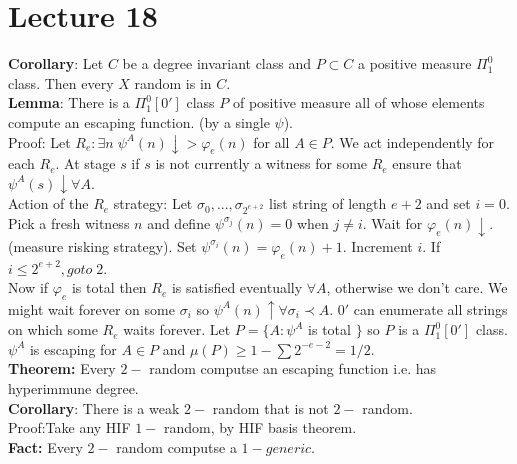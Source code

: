 \documentclass{article}
\begin{document}
      \section{Lecture 18}
      \textbf{Corollary}: Let $C $ be a degree invariant class and $P\subset C$ a positive measure $\Pi^0_1$ class. Then every $X$ random is in $C$. \\
      \textbf{Lemma}: There is a $\Pi^0_1[0']$ class $P$ of positive measure all of whose elements compute an escaping function. (by a single $\psi$).\\
      Proof: Let $R_e: \exists n \; \psi^A(n)\downarrow > \varphi_e(n)$ for all $A\in P$. We act independently for each $R_e$.  At stage $s$ if $s$ is not currently a witness for some $R_e$ ensure that $\psi^A(s)\downarrow \forall A$.\\
      Action of the $R_e$ strategy: Let $\sigma_0, ..., \sigma_{2^{e+2}}$ list string of length $e+2$ and set $i=0$. Pick a fresh witness $n$ and define $\psi^{\sigma_j}(n)=0$ when $j\neq i$. Wait for $\varphi_e(n)\downarrow$. (measure risking strategy). Set $\psi^{\sigma_i}(n) = \varphi_e(n)+1$. Increment $i$. If $i \leq 2^{e+2}, goto \;2$. \\
      Now if $\varphi_e$ is total then $R_e$ is satisfied eventually $\forall A$, otherwise we don't care. We might wait forever on some $\sigma_i$ so $\psi^A(n)\uparrow \forall \sigma_i \prec A$. $0'$ can enumerate all strings on which some $R_e$ waits forever. Let $P= \{A: \psi^A $ is total $\}$ so $P$ is a $\Pi^0_1[0']$ class. $\psi^A$ is escaping for $A \in P$ and $\mu(P) \geq 1 - \sum 2^{-e-2} = 1/2$.
      \\
      \textbf{Theorem:} Every $2-$ random computse an escaping function i.e. has hyperimmune degree.\\
      \textbf{Corollary}: There is a weak $2-$ random that is not $2-$ random.\\
      Proof:Take any HIF $1-$ random, by HIF basis theorem.\\
      \textbf{Fact:} Every $2-$ random computse a $1- generic$.
\end{document}
